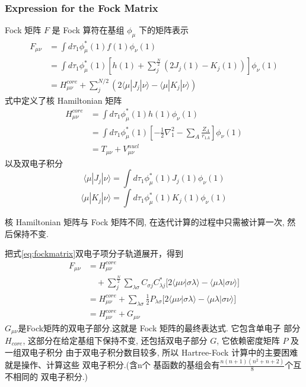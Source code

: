 \documentclass[fontset=none,12pt,a4paper]{ctexart}
\numberwithin{equation}{section}
\begin{document}
\subsubsection{Expression for the Fock Matrix}
Fock 矩阵 $F$ 是 Fock 算符在基组 ${\phi_{\mu}}$ 下的矩阵表示
\begin{equation}
  \begin{aligned}
      F_{\mu\nu}&=\int d\tau_1\phi_{\mu}^*(1)f(1)\phi_{\nu}(1) \\
      &=\int d\tau_1\phi_{\mu}^*(1)[h(1)+\sum_j^{\frac{N}{2}}(2J_j(1)-K_j(1))]\phi_{\nu}(1) \\
      &=H_{\mu\nu}^{core}+\sum_j^{N/2}(2\langle\mu|J_j|\nu\rangle-\langle\mu|K_j|\nu\rangle)
  \end{aligned}
\end{equation}
式中定义了核 Hamiltonian 矩阵
\begin{equation}
  \begin{aligned}
      H_{\mu\nu}^{core}&=\int d\tau_1\phi_{\mu}^*(1)h(1)\phi_{\nu}(1) \\
      &=\int d\tau_1\phi_{\mu}^*(1)[-\frac12\nabla_1^2-\sum_A\frac{Z_A}{r_{1A}}]\phi_{\nu}(1) \\
      &=T_{\mu\nu}+V_{\mu\nu}^{nucl}
  \end{aligned}
  \label{eq:fockmatrix}
\end{equation}
以及双电子积分
\begin{equation}
  \langle\mu|J_j|\nu\rangle=\int d\tau_1\phi_{\mu}^*(1)J_j(1)\phi_{\nu}(1)
\end{equation}
\begin{equation}
  \langle\mu|K_j|\nu\rangle=\int d\tau_1\phi_{\mu}^*(1)K_j(1)\phi_{\nu}(1)
\end{equation}

核 Hamiltonian 矩阵与 Fock 矩阵不同, 在迭代计算的过程中只需被计算一次, 然 后保持不变.

把式\ref{eq:fockmatrix}双电子项分子轨道展开，得到
\begin{equation}
 \begin{aligned}
  F_{\mu\nu} &= H_{\mu\nu}^{core} \\
  &\quad +\sum_j^{\frac{N}{2}}\sum_{\lambda\sigma}C_{\sigma j}C_{\lambda j}^*
     \bigl[2\langle\mu\nu|\sigma\lambda\rangle-\langle\mu\lambda|\sigma\nu\rangle\bigr] \\
  &= H_{\mu\nu}^{core}
     +\sum_{\lambda\sigma}\frac12P_{\lambda\sigma}
     \bigl[2\langle\mu\nu|\sigma\lambda\rangle-\langle\mu\lambda|\sigma\nu\rangle\bigr] \\
  &= H_{\mu\nu}^{core}+G_{\mu\nu}
 \end{aligned}
\end{equation}
$G_{\mu\nu}$是Fock矩阵的双电子部分.这就是 Fock 矩阵的最终表达式. 它包含单电子 部分 $H_{core}$,
 这部分在给定基组下保持不变, 还包括双电子部分 $G$, 它依赖密度矩阵 $P$ 及一组双电子积分
由于双电子积分数目较多, 所以 Hartree-Fock 计算中的主要困难就是操作、计算这些 双电子积分.(含n个
基函数的基组会有$\frac{n(n+1)(n^2+n+2)}{8}$个互不相同的 双电子积分.)
\end{document}
